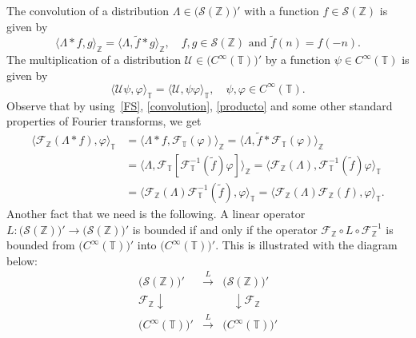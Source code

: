 \documentclass[11pt]{amsart}
\numberwithin{equation}{section}
\newcommand{\Z}{\mathbb{Z}}
\newcommand{\T}{\mathbb{T}}
\theoremstyle{plain}
\theoremstyle{remark}
\begin{document}
The convolution of  a distribution $\Lambda \in \big( \mathcal{S}(\Z) \big)'$ with a function $f \in \mathcal{S}(\Z) $ is given by
\begin{equation}\label{convolution}
\big\langle \Lambda * f, g \big\rangle_{\Z} = \big\langle \Lambda, \tilde{f}*g\big\rangle_{\Z} ,
\quad f,g \in \mathcal{S}(\Z) \text{ and } \tilde{f} (n) = f(-n).
\end{equation}
The multiplication of a distribution $\mathcal{U}\in \big( C^\infty(\T) \big)'$ by a function $\psi \in C^\infty(\T)$ is given by
\begin{equation}\label{producto}
\big\langle \mathcal{U} \psi, \varphi \big\rangle_{\T} = \big\langle  \mathcal{U} , \psi \varphi \big\rangle_{\T} ,
\quad \psi, \varphi  \in C^\infty(\T).
\end{equation}
Observe that by using~\eqref{FS}, \eqref{convolution}, \eqref{producto} and some other standard properties of Fourier transforms, we get
\begin{equation*}
\begin{aligned}
\big\langle \mathcal{F}_\Z(\Lambda* f), \varphi \big\rangle_{\T}
&= \big\langle \Lambda* f, \mathcal{F}_\T(\varphi) \big\rangle_{\Z}
= \big\langle \Lambda, \tilde{f}* \mathcal{F}_\T(\varphi) \big\rangle_{\Z} \\
&= \big\langle \Lambda, \mathcal{F}_\T[  \mathcal{F}_\T^{-1}(\tilde{f})  \varphi] \big\rangle_{\Z}
= \big\langle  \mathcal{F}_\Z (\Lambda), \mathcal{F}_\T^{-1}(\tilde{f})  \varphi \big\rangle_{\T}  \\
&= \big\langle  \mathcal{F}_\Z (\Lambda)  \mathcal{F}_\T^{-1}(\tilde{f}),  \varphi \big\rangle_{\T}
=  \Big\langle  \mathcal{F}_\Z (\Lambda)  \mathcal{F}_\Z(f), \varphi \big\rangle_{\T}.
\end{aligned}
\end{equation*}
Another fact that we need is the following. A linear operator $L: \big( \mathcal{S}(\Z) \big)' \to \big( \mathcal{S}(\Z) \big)'$ is bounded if and only if the operator $\mathcal{F}_\Z \circ L \circ \mathcal{F}_\Z^{-1}$ is bounded from
$\big( C^\infty(\T) \big)'$ into  $\big( C^\infty(\T) \big)'.$  This is illustrated with the diagram below:
\begin{equation}
\label{diagrama}
\begin{array}{ccc}
\big( \mathcal{S}(\Z) \big)' & \stackrel{L}{\longrightarrow} & \big( \mathcal{S}(\Z) \big)' \\[12pt]
\mathcal{F}_\Z\!\downarrow\phantom{\!\mathcal{F}} & & \phantom{\mathcal{F}\!}\downarrow\!\mathcal{F}_\Z \\[6pt]
\big( C^\infty(\T) \big)' & \stackrel{L}{\longrightarrow} & \big( C^\infty(\T) \big)'
\end{array}
\end{equation}
\end{document}
